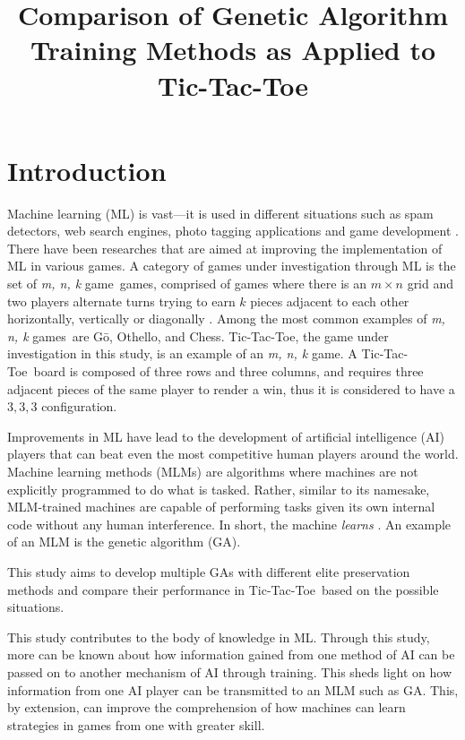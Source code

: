 \documentclass{strrespaper-journ}
\title{Comparison of Genetic Algorithm Training Methods as Applied to Tic-Tac-Toe} %
\affiliation{
	Philippine Science High School -- Cordillera Administrative Region Campus, Purok 12, Irisan,\\
	Baguio City, 2600, Philippines
}
\newcommand{\mnk}{\textit{m, n, k} game}
\newcommand{\mnkpl}{\textit{m, n, k} games}
\newcommand{\ttt}{Tic-Tac-Toe}
\begin{document}
	\maketitle

	\section{Introduction}
		Machine learning (ML) is vast---it is used in different situations such as spam detectors, web search engines, photo tagging applications and game development \autocite{sharmaMachineLearningApplications2016}.
		There have been researches that are aimed at improving the implementation of ML in various games.
		A category of games under investigation through ML is the set of \mnk\ games, comprised of games where there is an $m \times n$ grid and two players alternate turns trying to earn $k$ pieces adjacent to each other horizontally, vertically or diagonally \autocite{hayesDevelopingMemoryEfficient2016}.
		Among the most common examples of \mnkpl\ are G\=o, Othello, and Chess.
		\ttt, the game under investigation in this study, is an example of an \mnk.
		A \ttt\ board is composed of three rows and three columns, and requires three adjacent pieces of the same player to render a win, thus it is considered to have a $3, 3, 3$ configuration.

		Improvements in ML have lead to the development of artificial intelligence (AI) players that can beat even the most competitive human players around the world.
		Machine learning methods (MLMs) are algorithms where machines are not explicitly programmed to do what is tasked.
		Rather, similar to its namesake, MLM-trained machines are capable of performing tasks given its own internal code without any human interference.
		In short, the machine \textit{learns} \autocite{geeksforgeeksMachineLearning}.
		An example of an MLM is the genetic algorithm (GA).

		This study aims to develop multiple GAs with different elite preservation methods and compare their performance in \ttt\ based on the possible situations.

		This study contributes to the body of knowledge in ML.
		Through this study, more can be known about how information gained from one method of AI can be passed on to another mechanism of AI through training.
		This sheds light on how information from one AI player can be transmitted to an MLM such as GA.
		This, by extension, can improve the comprehension of how machines can learn strategies in games from one with greater skill.
\end{document}
